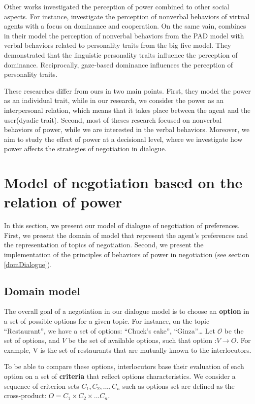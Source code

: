 \documentclass{llncs}
\begin{document}
	\par Other works investigated the perception of power combined to other social aspects. For instance,\cite{strassmann2016effect} investigate the perception of nonverbal behaviors of virtual agents with a focus on dominance and cooperation. On the same vain,  \cite{bee2010bossy} combines in their model the perception of nonverbal behaviors from the PAD model \cite{mehrabian1996analysis} with verbal behaviors related to personality traits from the big five model.
	 They demonstrated that the linguistic personality traits influence the perception of dominance. Reciprocally, gaze-based dominance influences the perception of personality traits.
	
	 
	These researches differ from ours in two main points. First, they model the power as an individual trait, while in our research, we consider the power as an interpersonal relation, which means that it takes place between the agent and the user(dyadic trait). 
	Second, most of theses research focused on nonverbal behaviors of power, while we are interested in the verbal behaviors. Moreover, we aim to study the effect of power at a decisional level, where we investigate how power affects the strategies of negotiation in dialogue.
	
	
	\section{Model of negotiation based on the relation of power}
	In this section, we present our model of dialogue of negotiation of preferences.	
	First, we present the domain of model that represent the agent's preferences and the representation of topics of negotiation. Second, we present the implementation of the principles of behaviors of power in negotiation (see section \ref{domDialogue}).

	\subsection{Domain model}
	The overall goal of a negotiation in our dialogue model is to choose an \textbf{option} in a set of possible options for a given topic. For instance, on the topic ``Restaurant'', we have a set of options: ``Chuck's cake'', ``Ginza''\ldots 
	 Let $\mathcal{O}$ be the set of options, and $V$ be the set of available options, such that option :$ V\rightarrow O$. For example, V is the set of restaurants that are mutually known to the interlocutors. 
		
	\par To be able to compare these options, interlocutors base their evaluation of each option on a set of \textbf{criteria} that reflect options characteristics. We consider a sequence of criterion sets $C_1, C_2, ..., C_n$ such as options set are defined as the cross-product:
	$O = C_1 \times C_2 \times \ldots C_n$.
	
\end{document}
